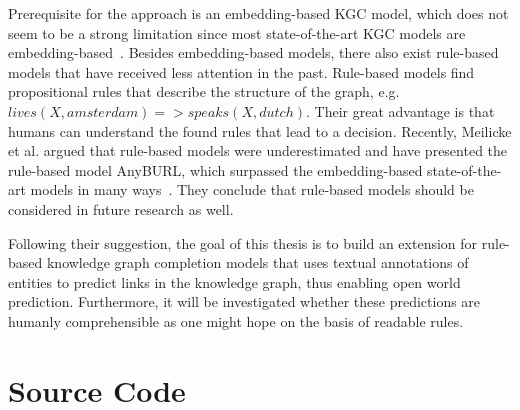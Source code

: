 Prerequisite for the approach is an embedding-based KGC model, which does not seem to be a strong limitation since most state-of-the-art KGC models are embedding-based~\cite{Wang2017KnowledgeGE}. Besides embedding-based models, there also exist rule-based models that have received less attention in the past. Rule-based models find propositional rules that describe the structure of the graph, e.g. $ lives(X, amsterdam) => speaks(X, dutch) $. Their great advantage is that humans can understand the found rules that lead to a decision. Recently, Meilicke et al. argued that rule-based models were underestimated and have presented the rule-based model AnyBURL, which surpassed the embedding-based state-of-the-art models in many ways~\cite{Meilicke2019AnytimeBR}. They conclude that rule-based models should be considered in future research as well.

Following their suggestion, the goal of this thesis is to build an extension for rule-based knowledge graph completion models that uses textual annotations of entities to predict links in the knowledge graph, thus enabling open world prediction. Furthermore, it will be investigated whether these predictions are humanly comprehensible as one might hope on the basis of readable rules.


\section{Source Code}
\label{sec:1_introduction/1_source_code}

